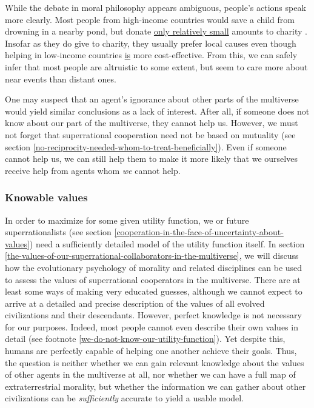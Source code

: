 While the debate in moral philosophy appears ambiguous, people's actions
speak more clearly. Most people from high-income countries would save a
child from drowning in a nearby pond, but donate
\href{http://nccs.urban.org/nccs/statistics/charitable-giving-in-america-some-facts-and-figures.cfm}{only
relatively small} amounts to charity
\parencite{Singer1972-uk}. Insofar as they do give to
charity, they usually prefer local causes even though helping in
low-income countries
\href{http://www.givewell.org/giving101/Your-dollar-goes-further-overseas}{is}
more cost-effective. From this, we can safely infer that most people are
altruistic to some extent, but seem to care more about near events than distant ones.

One may suspect that an agent's ignorance about other parts of the
multiverse would yield similar conclusions as a lack of interest. After
all, if someone does not know about our part of the multiverse, they
cannot help us. However, we must not forget that superrational
cooperation need not be based on mutuality (see section
\ref{no-reciprocity-needed-whom-to-treat-beneficially}). Even if someone
cannot help us, we can still help them to make it more likely that we
ourselves receive help from agents whom \emph{we} cannot help.

\subsubsection{Knowable values}\label{knowable-values}

In order to maximize for some given utility function, we or future
superrationalists (see section
\ref{cooperation-in-the-face-of-uncertainty-about-values}) need a
sufficiently detailed model of the utility function itself. In section
\ref{the-values-of-our-superrational-collaborators-in-the-multiverse}, we will discuss how the
evolutionary psychology of morality and related disciplines can be used to assess the values of
superrational cooperators in the multiverse. There are at least some ways of making very educated
guesses, although we cannot expect to arrive at a detailed and precise description of the values of
all evolved civilizations and their descendants. However, perfect knowledge is not necessary for our
purposes. Indeed, most people cannot even describe their own values in detail (see footnote
\ref{we-do-not-know-our-utility-function}). Yet despite this, humans are perfectly capable of
helping one another achieve their goals. Thus, the question is neither whether we can gain relevant
knowledge about the values of other agents in the multiverse at all, nor whether we can have a full
map of extraterrestrial morality, but whether the information we can gather about other
civilizations can be \emph{sufficiently} accurate to yield a usable model.

